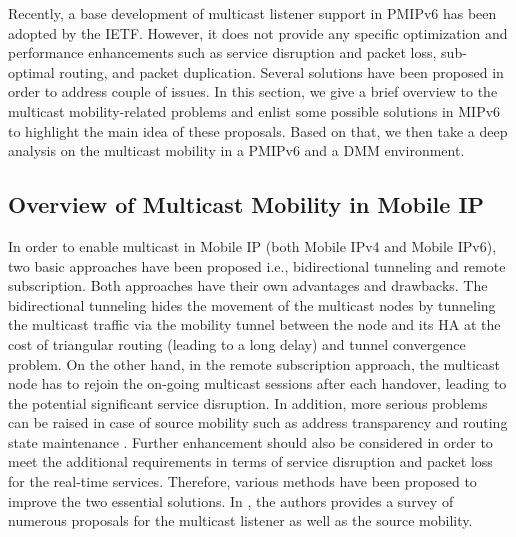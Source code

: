 Recently, a base development of multicast listener support in PMIPv6 has been adopted by the IETF. However, it does not provide any specific optimization and performance enhancements such as service disruption and packet loss, sub-optimal routing, and packet duplication. Several solutions have been proposed in order to address couple of issues. In this section, we give a brief overview to the multicast mobility-related problems and enlist some possible solutions in MIPv6 to highlight the main idea of these proposals. Based on that, we then take a deep analysis on the multicast mobility in a PMIPv6 and a DMM environment. 

\subsection{Overview of Multicast Mobility in Mobile IP}
In order to enable multicast in Mobile IP (both Mobile IPv4 and Mobile IPv6), two basic approaches have been proposed i.e., bidirectional tunneling and remote subscription. Both approaches have their own advantages and drawbacks. The bidirectional tunneling hides the movement of the multicast nodes by tunneling the multicast traffic via the mobility tunnel between the node and its HA at the cost of triangular routing (leading to a long delay) and tunnel convergence problem. On the other hand, in the remote subscription approach, the multicast node has to rejoin the on-going multicast sessions after each handover, leading to the potential significant service disruption. In addition, more serious problems can be raised in case of source mobility such as address transparency and routing state maintenance \cite{Multicast_MIPv6, multicast_challenges_solutions}. Further enhancement should also be considered in order to meet the additional requirements in terms of service disruption and packet loss for the real-time services. Therefore, various methods have been proposed to improve the two essential solutions. In \cite{multicast_challenges_solutions,Multicast_MIPv6}, the authors provides a survey of numerous proposals for the multicast listener as well as the source mobility. 

